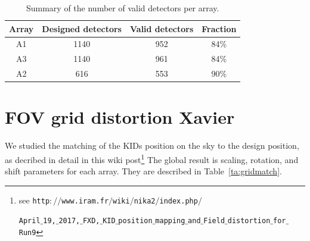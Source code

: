 
\begin{table}[ht]
\begin{center}  
  \begin{tabular}{|c|c|c|c|}
    \hline
    Array & Designed detectors &  Valid detectors & Fraction\\
    \hline\hline
    A1 & 1140 & 952 &  84\%\\
    A3 & 1140 & 961 &  84\%\\
    A2 & 616  & 553 &  90\%\\
    \hline
  \end{tabular}
  \caption[Number of detectors]{Summary of the number of valid detectors per array.}
  \label{tab:number_of_kids}
\end{center}    
\end{table}


\section{FOV grid distortion {\color{blue} Xavier }  }
\label{se:grid_distortion}

We studied the matching of the KIDs position on the sky to the
design position, as decribed in detail in this wiki post\footnote{see
  {\tt http$://$www.iram.fr$/$wiki$/$nika2$/$index.php$/$}
  
  {\tt April$\_$19,$\_$2017,$\_$FXD,$\_$KID$\_$position$\_$mapping$\_$and$\_$Field$\_$distortion$\_$for$\_$Run9}
}
The global result is scaling, rotation, and shift parameters for each
array. They are described in Table~\ref{ta:gridmatch}.

